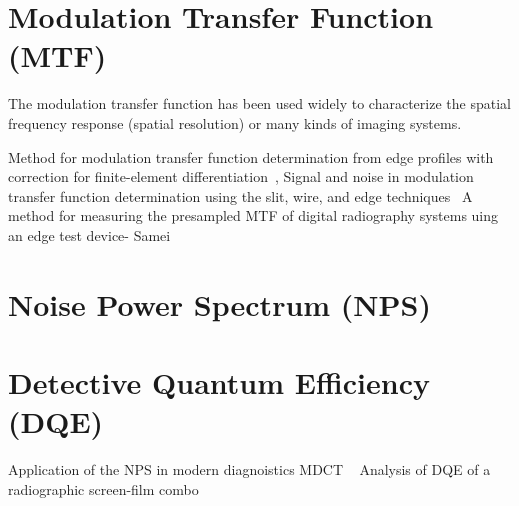 

\section{Modulation Transfer Function (MTF) }
The modulation transfer function has been used widely to characterize the spatial frequency response (spatial resolution) or many kinds of imaging systems.


Method for modulation transfer function determination from edge profiles with correction for finite-element differentiation~\cite{Cunningham1987}, 
Signal and noise in modulation transfer function determination using the slit, wire, and edge techniques~\cite{Cunningham1992}
A method for measuring the presampled MTF of digital radiography systems uing an edge test device- Samei \citep{samei1998}
\section{Noise Power Spectrum (NPS)}
\section{Detective Quantum Efficiency (DQE) }
Application of the NPS in modern diagnoistics MDCT ~\cite{Boedeker2007}
Analysis of DQE of a radiographic screen-film combo~\cite{Bunch1987}
